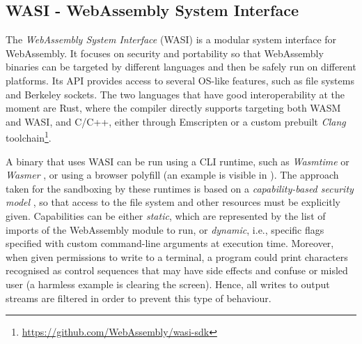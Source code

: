 \subsection{WASI - WebAssembly System Interface}
\label{sec:introduction-wasi}

The \textit{WebAssembly System Interface} (WASI) \cite{wasi} is a modular system interface for WebAssembly.
It focuses on security and portability so that WebAssembly binaries can be targeted by different languages
and then be safely run on different platforms.
Its API provides access to several OS-like features, such as file systems and Berkeley sockets.
The two languages that have good interoperability at the moment are Rust, where the compiler directly supports targeting both WASM and WASI,
and C/C++, either through Emscripten or a custom prebuilt \textit{Clang} toolchain\footnote{\url{https://github.com/WebAssembly/wasi-sdk}}.

A binary that uses WASI can be run using a CLI runtime, such as \textit{Wasmtime} \cite{wasmtime} or \textit{Wasmer} \cite{wasmer},
or using a browser polyfill (an example is visible in \cite{wasi-polyfill}).
The approach taken for the sandboxing by these runtimes is based on a \textit{capability-based security model} \cite{wasmtime-security-sandboxing},
so that access to the file system and other resources must be explicitly given. Capabilities can be either \textit{static}, which
are represented by the list of imports of the WebAssembly module to run, or \textit{dynamic}, i.e., specific flags
specified with custom command-line arguments at execution time.
Moreover, when given permissions to write to a terminal, a program could print characters recognised as control
sequences that may have side effects and confuse or misled user (a harmless example is clearing the screen).
Hence, all writes to output streams are filtered in order to prevent this type of behaviour.

